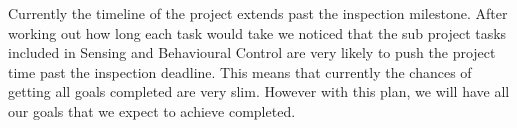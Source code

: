 Currently the timeline of the project extends past the inspection milestone.
After working out how long each task would take we noticed that the sub project
tasks included in Sensing and Behavioural Control are very likely to push the
project time past the inspection deadline. This means that currently the chances
of getting all goals completed are very slim. However with this plan, we will
have all our goals that we expect to achieve completed.


